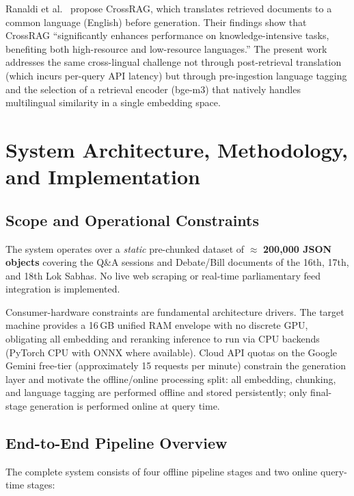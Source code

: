 \documentclass[conference]{IEEEtran}
\begin{document}
Ranaldi et al.~\cite{multilingualrag_2025} propose CrossRAG, which translates
retrieved documents to a common language (English) before generation.
Their findings show that CrossRAG ``significantly enhances performance on
knowledge-intensive tasks, benefiting both high-resource and low-resource
languages.''
The present work addresses the same cross-lingual challenge not through
post-retrieval translation (which incurs per-query API latency) but through
pre-ingestion language tagging and the selection of a retrieval encoder
(bge-m3) that natively handles multilingual similarity in a single embedding
space.

\section{System Architecture, Methodology, and Implementation}
\label{sec:arch}

\subsection{Scope and Operational Constraints}

The system operates over a \emph{static} pre-chunked dataset of $\approx$
\textbf{200,000 JSON objects} covering the Q\&A sessions and Debate/Bill
documents of the 16th, 17th, and 18th Lok Sabhas.
No live web scraping or real-time parliamentary feed integration is
implemented.

Consumer-hardware constraints are fundamental architecture drivers.
The target machine provides a 16\,GB unified RAM envelope with no discrete GPU,
obligating all embedding and reranking inference to run via CPU backends
(PyTorch CPU with ONNX where available).
Cloud API quotas on the Google Gemini free-tier (approximately 15 requests per
minute) constrain the generation layer and motivate the offline/online
processing split: all embedding, chunking, and language tagging are performed
offline and stored persistently; only final-stage generation is performed
online at query time.

\subsection{End-to-End Pipeline Overview}

The complete system consists of four offline pipeline stages and two online
query-time stages:
\end{document}
